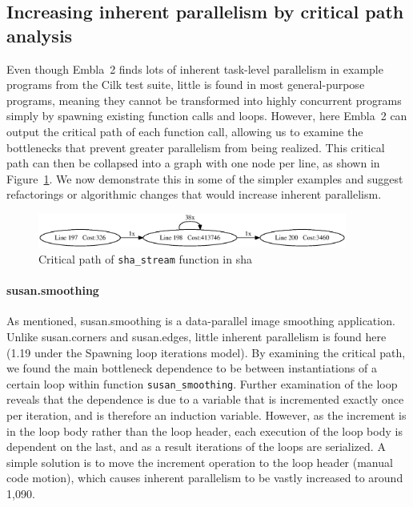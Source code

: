 \subsection{Increasing inherent parallelism by critical path analysis} \label{sresults:increasing}

Even though Embla~2 finds lots of inherent task-level parallelism in example programs from the Cilk test suite, little is found in most general-purpose programs, meaning they cannot be transformed into highly concurrent programs simply by spawning existing function calls and loops.
However, here Embla~2 can output the critical path of each function call, allowing us to examine the bottlenecks that prevent greater parallelism from being realized.
This critical path can then be collapsed into a graph with one node per line,
as shown in Figure~\ref{sha-critpath}.
We now demonstrate this in some of the simpler examples and suggest refactorings or algorithmic changes that would increase inherent parallelism.

\begin{figure}[t]
 \centering
 \includegraphics[width=4in]{sha_driver-c-24}
 \caption{Critical path of {\tt sha\_stream} function in \textsf{sha}}
 \label{sha-critpath}
\end{figure}

\paragraph{\textsf{susan.smoothing}}

As mentioned, \textsf{susan.smoothing} is a data-parallel image smoothing application.
Unlike \textsf{susan.corners} and \textsf{susan.edges}, little inherent parallelism is found here (1.19 under the \textsf{Spawning loop iterations} model).
By examining the critical path, we found the main bottleneck dependence to be between instantiations of a certain loop within function \texttt{susan\_smoothing}.
Further examination of the loop reveals that the dependence is due to a variable that is incremented exactly once per iteration, and is therefore an induction variable.
However, as the increment is in the loop body rather than the loop header, each execution of the loop body is dependent on the last, and as a result iterations of the loops are serialized.
A simple solution is to move the increment operation to the loop header (manual code motion), which causes inherent parallelism to be vastly increased to around 1,090.

